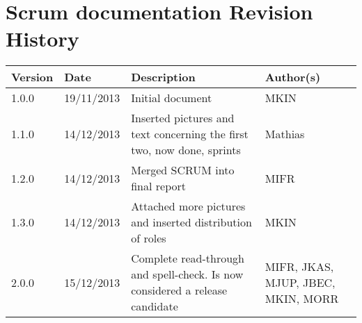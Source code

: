 \section{Scrum documentation Revision History}
\begin{center}
    \begin{tabular}{ | l | l | p{6cm} | p{4cm} |}
    \hline
    Version & Date & Description & Author(s) 
    \\ \hline
    1.0.0 & 19/11/2013 & Initial document & MKIN
    \\ \hline
    1.1.0 & 14/12/2013 & Inserted pictures and text concerning the first two, now done, sprints & Mathias
    \\ \hline
    1.2.0 & 14/12/2013 & Merged SCRUM into final report & MIFR
    \\ \hline
    1.3.0 & 14/12/2013 & Attached more pictures and inserted distribution of roles & MKIN
    \\ \hline
    2.0.0 & 15/12/2013 & Complete read-through and spell-check. Is now considered a release candidate & MIFR, JKAS, MJUP, JBEC, MKIN, MORR
    \\ \hline
    \end{tabular}
\end{center}